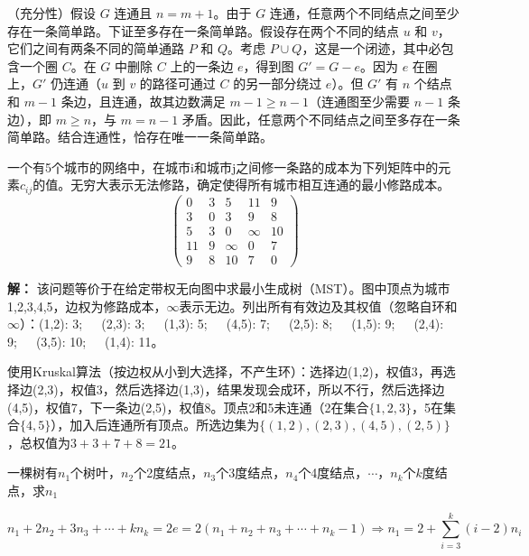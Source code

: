 （充分性）假设 $G$ 连通且 $n = m+1$。由于 $G$ 连通，任意两个不同结点之间至少存在一条简单路。下证至多存在一条简单路。假设存在两个不同的结点 $u$ 和 $v$，它们之间有两条不同的简单通路 $P$ 和 $Q$。考虑 $P \cup Q$，这是一个闭迹，其中必包含一个圈 $C$。在 $G$ 中删除 $C$ 上的一条边 $e$，得到图 $G' = G - e$。因为 $e$ 在圈上，$G'$ 仍连通（$u$ 到 $v$ 的路径可通过 $C$ 的另一部分绕过 $e$）。但 $G'$ 有 $n$ 个结点和 $m-1$ 条边，且连通，故其边数满足 $m-1 \ge n-1$（连通图至少需要 $n-1$ 条边），即 $m \ge n$，与 $m = n-1$ 矛盾。因此，任意两个不同结点之间至多存在一条简单路。结合连通性，恰存在唯一一条简单路。

\begin{example}{}{}
    一个有5个城市的网络中，在城市i和城市j之间修一条路的成本为下列矩阵中的元素$c_{ij}$的值。无穷大表示无法修路，确定使得所有城市相互连通的最小修路成本。
    \[\begin{pmatrix}
        0&3&5&11&9\\
        3&0&3&9&8\\
        5&3&0&\infty&10\\
        11&9&\infty&0&7\\
        9&8&10&7&0
    \end{pmatrix}\]
\end{example}
\textbf{解：} 该问题等价于在给定带权无向图中求最小生成树（MST）。图中顶点为城市1,2,3,4,5，边权为修路成本，$\infty$表示无边。列出所有有效边及其权值（忽略自环和$\infty$）：(1,2): 3;~~~(2,3): 3;~~~(1,3): 5;~~~(4,5): 7;~~~(2,5): 8;~~~(1,5): 9;~~~(2,4): 9;~~~(3,5): 10;~~~(1,4): 11。

使用Kruskal算法（按边权从小到大选择，不产生环）：选择边(1,2)，权值3，再选择边(2,3)，权值3，然后选择边(1,3)，结果发现会成环，所以不行，然后选择边(4,5)，权值7，下一条边(2,5)，权值8。顶点2和5未连通（2在集合$\{1,2,3\}$，5在集合$\{4,5\}$），加入后连通所有顶点。所选边集为$\{(1,2),(2,3),(4,5),(2,5)\}$，总权值为$3+3+7+8=21$。
\begin{example}{}{}
    一棵树有$n_1$个树叶，$n_2$个2度结点，$n_3$个3度结点，$n_4$个4度结点，$\cdots$，$n_k$个$k$度结点，求$n_1$
\end{example}
\vspace{-20pt}\[n_1+2n_2+3n_3+\cdots+kn_k=2e=2(n_1+n_2+n_3+\cdots+n_k-1)\Rightarrow n_1 = 2 + \sum_{i=3}^k (i-2)n_i\]
